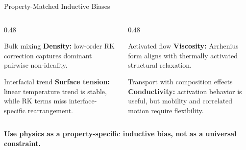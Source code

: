 \documentclass[aspectratio=169,10pt]{beamer}
\newcommand{\best}[1]{\textcolor{SaltTeal}{\textbf{#1}}}
\begin{document}
\begin{frame}{Property-Matched Inductive Biases}
  \begin{columns}[T,onlytextwidth]
    \begin{column}{0.48\textwidth}
      \begin{block}{Bulk mixing}
        \textbf{Density:} low-order RK correction captures dominant pairwise non-ideality.
      \end{block}
      \begin{block}{Interfacial trend}
        \textbf{Surface tension:} linear temperature trend is stable, while RK terms miss interface-specific rearrangement.
      \end{block}
    \end{column}
    \begin{column}{0.48\textwidth}
      \begin{block}{Activated flow}
        \textbf{Viscosity:} Arrhenius form aligns with thermally activated structural relaxation.
      \end{block}
      \begin{block}{Transport with composition effects}
        \textbf{Conductivity:} activation behavior is useful, but mobility and correlated motion require flexibility.
      \end{block}
    \end{column}
  \end{columns}
  \vfill
  \centering
  \best{Use physics as a property-specific inductive bias, not as a universal constraint.}
\end{frame}
\end{document}
